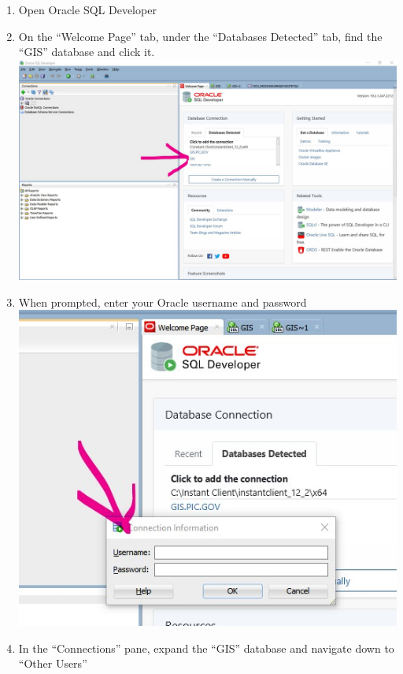 \documentclass[
]{book}
\providecommand{\tightlist}{%
  \setlength{\itemsep}{0pt}\setlength{\parskip}{0pt}}
\begin{document}
\begin{enumerate}
\def\labelenumi{\arabic{enumi}.}
\tightlist
\item
  Open Oracle SQL Developer
\item
  On the ``Welcome Page'' tab, under the ``Databases Detected'' tab, find the ``GIS'' database and click it.
  \includegraphics{images/SQL_Dev_Screenshot_1.jpg}
\item
  When prompted, enter your Oracle username and password
  \includegraphics{images/SQL_Dev_Screenshot_2.jpg}
\item
  In the ``Connections'' pane, expand the ``GIS'' database and navigate down to ``Other Users''

\end{enumerate}
\end{document}
